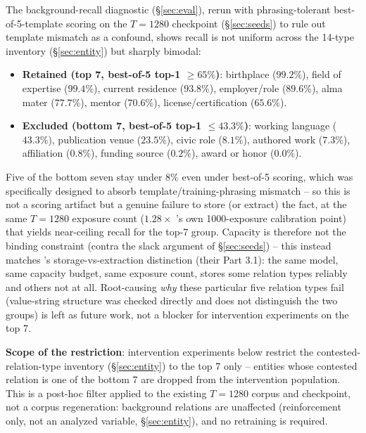 \documentclass[11pt]{article}
\begin{document}
The background-recall diagnostic (\S\ref{sec:eval}), rerun with
phrasing-tolerant best-of-5-template scoring on the $T{=}1280$ checkpoint
(\S\ref{sec:seeds}) to rule out template mismatch as a confound, shows
recall is not uniform across the 14-type inventory (\S\ref{sec:entity}) but
sharply bimodal:

\begin{itemize}
  \item \textbf{Retained (top 7, best-of-5 top-1 $\geq 65\%$)}: birthplace
    ($99.2\%$), field of expertise ($99.4\%$), current residence ($93.8\%$),
    employer/role ($89.6\%$), alma mater ($77.7\%$), mentor ($70.6\%$),
    license/certification ($65.6\%$).
  \item \textbf{Excluded (bottom 7, best-of-5 top-1 $\leq 43.3\%$)}: working
    language ($43.3\%$), publication venue ($23.5\%$), civic role ($8.1\%$),
    authored work ($7.3\%$), affiliation ($0.8\%$), funding source
    ($0.2\%$), award or honor ($0.0\%$).
\end{itemize}

Five of the bottom seven stay under $8\%$ even under best-of-5 scoring,
which was specifically designed to absorb template/training-phrasing
mismatch -- so this is not a scoring artifact but a genuine failure to store
(or extract) the fact, at the same $T{=}1280$ exposure count ($1.28\times$
\citet{allenzhu2024capacity}'s own 1000-exposure calibration point) that
yields near-ceiling recall for the top-7 group. Capacity is therefore not
the binding constraint (contra the slack argument of \S\ref{sec:seeds}) --
this instead matches \citet{allenzhu2024capacity}'s storage-vs-extraction
distinction (their Part 3.1): the same model, same capacity budget, same
exposure count, stores some relation types reliably and others not at all.
Root-causing \emph{why} these particular five relation types fail
(value-string structure was checked directly and does not distinguish the
two groups) is left as future work, not a blocker for intervention
experiments on the top 7.

\textbf{Scope of the restriction}: intervention experiments below restrict
the contested-relation-type inventory (\S\ref{sec:entity}) to the top 7
only -- entities whose contested relation is one of the bottom 7 are dropped
from the intervention population. This is a post-hoc filter applied to the
existing $T{=}1280$ corpus and checkpoint, not a corpus regeneration:
background relations are unaffected (reinforcement only, not an analyzed
variable, \S\ref{sec:entity}), and no retraining is required.
\end{document}
